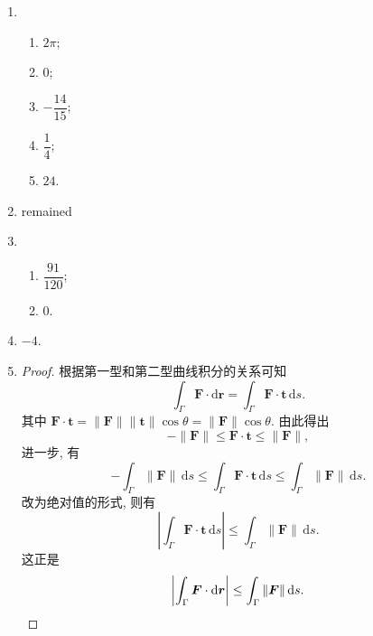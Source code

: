 % 
\begin{enumerate}
    \item %
        \begin{enumerate}[(1)]
            \item %
                $2\pi$;
            \item %
                $0$;
            \item %
                $-\dfrac{14}{15}$;
            \item %
                $\dfrac{1}{4}$;
            \item %
                $24$.
        \end{enumerate}
    \item %
        {\color{red}remained}
    \item %
        \begin{enumerate}[(1)]
            \item %
                $\dfrac{91}{120}$;
            \item %
                $0$.
        \end{enumerate}
    \item %
        $-4$.
    \item %
        \begin{proof}
            根据第一型和第二型曲线积分的关系可知
            \[
                \int_{\Gamma}\boldsymbol{F} \cdot \mathrm{d}\boldsymbol{r} = \int_{\Gamma} \boldsymbol{F}\cdot \boldsymbol{t}\,\mathrm{d}s.    
            \]
            其中 $\boldsymbol{F}\cdot\boldsymbol{t} = \|\boldsymbol{F}\|\|\boldsymbol{t}\|\cos\theta = \|\boldsymbol{F}\|\cos\theta$. 由此得出
            \[
                -\|\boldsymbol{F}\| \leq \boldsymbol{F}\cdot\boldsymbol{t} \leq \|\boldsymbol{F}\|,    
            \]
            进一步, 有
            \[
                -\int_{\Gamma}\|\boldsymbol{F}\|\,\mathrm{d}s \leq \int_{\Gamma}\boldsymbol{F}\cdot\boldsymbol{t}\,\mathrm{d}s \leq \int_{\Gamma}\|\boldsymbol{F}\|\,\mathrm{d}s.   
            \]
            改为绝对值的形式, 则有
            \[
                \left|\int_{\Gamma}\boldsymbol{F}\cdot\boldsymbol{t}\,\mathrm{d}s\right| \leq \int_{\Gamma}\|\boldsymbol{F}\|\,\mathrm{d}s.   
            \]
            这正是
            \[
                \left|\int_{\Gamma}\boldsymbol{F} \cdot \mathrm{d}\boldsymbol{r}\right| \leq \int_{\Gamma}\|\boldsymbol{F}\|\,\mathrm{d}s. \qedhere  
            \]
            
        \end{proof}
\end{enumerate}
% 
